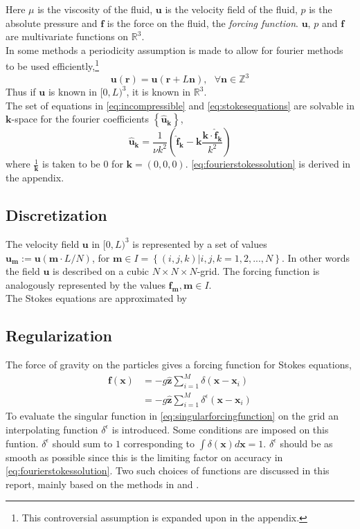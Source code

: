 \documentclass[a4paper,twoside=false,abstract=false,numbers=noenddot,
titlepage=false,headings=small,parskip=half,version=last]{scrartcl}
\begin{document}
Here $\mu$ is the viscosity of the fluid, $\mathbf{u}$ is the velocity field of the fluid, $p$ is the absolute pressure and $\mathbf{f}$ is the force on the fluid, the \emph{forcing function}. $\mathbf{u}$, $p$ and $\mathbf{f}$ are multivariate functions on $\mathbb{R}^3$.\\

In some methods a periodicity assumption is made to allow for fourier methods to be used efficiently,\footnote{This controversial assumption is expanded upon in the appendix.}
\begin{equation}
\mathbf{u}(\mathbf{r}) = \mathbf{u}(\mathbf{r}+L\mathbf{n}),\text{ }\forall \mathbf{n} \in \mathbb{Z}^3
\end{equation}
Thus if $\mathbf{u}$ is known in $[0,L)^3$, it is known in $\mathbb{R}^3$.\\
The set of equations in \eqref{eq:incompressible} and \eqref{eq:stokesequations} are solvable in $\mathbf{k}$-space for the fourier coefficients $\left\{\hat{\mathbf{u}}_\mathbf{k}\right\}$,
\begin{equation}
\hat{\mathbf{u}}_\mathbf{k} = \frac{1}{\nu k^2} \left( \hat{\mathbf{f}}_\mathbf{k} - \mathbf{k} \frac{\mathbf{k}\cdot \hat{\mathbf{f}}_\mathbf{k}}{k^2} \right) \label{eq:fourierstokessolution}
\end{equation}
where $\frac{1}{\mathbf{k}}$ is taken to be $0$ for $\mathbf{k}=(0,0,0)$. \eqref{eq:fourierstokessolution} is derived in the appendix.
\subsection{Discretization}
The velocity field $\mathbf{u}$ in $[0,L)^3$ is represented by a set of values $\mathbf{u}_\mathbf{m}:=\mathbf{u}(\mathbf{m}\cdot L/N)$, for $\mathbf{m}\in I = \left\{(i,j,k) | i,j,k=1,2,...,N\right\}$.
In other words the field $\mathbf{u}$ is described on a cubic $N\times N\times N$-grid.
The forcing function is analogously represented by the values $\mathbf{f}_\mathbf{m}, \mathbf{m}\in I$.\\
The Stokes equations are approximated by 

\subsection{Regularization}
The force of gravity on the particles gives a forcing function for Stokes equations,
\begin{align}
\mathbf{f}(\mathbf{x}) &= -g\hat{\mathbf{z}}\sum_{i=1}^M \delta (\mathbf{x}-\mathbf{x}_i)\label{eq:singularforcingfunction}\\
&= -g\hat{\mathbf{z}}\sum_{i=1}^M \delta^\epsilon (\mathbf{x}-\mathbf{x}_i)
\end{align}
To evaluate the singular function in \eqref{eq:singularforcingfunction} on the grid an interpolating function $\delta^\epsilon$ is introduced.
Some conditions are imposed on this funtion.
$\delta^\epsilon$ should sum to $1$ corresponding to $\int \delta(\mathbf{x}) d\mathbf{x}=1$.
$\delta^\epsilon$ should be as smooth as possible since this is the limiting factor on accuracy in \eqref{eq:fourierstokessolution}.
Two such choices of functions are discussed in this report, mainly based on the methods in \cite{spectralewald} and \cite{interfaceregularization}.
\end{document}
